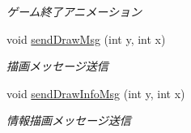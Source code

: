 \begin{DoxyCompactItemize}
\begin{DoxyCompactList}\small\item\em ゲーム終了アニメーション \end{DoxyCompactList}\item 
void \hyperlink{classjp_1_1gr_1_1java__conf_1_1yuta__yoshinaga_1_1reversi_1_1model_1_1_reversi_play_a93ebdb5fb7097984730a85f62ebb57d7}{send\+Draw\+Msg} (int y, int x)
\begin{DoxyCompactList}\small\item\em 描画メッセージ送信 \end{DoxyCompactList}\item 
void \hyperlink{classjp_1_1gr_1_1java__conf_1_1yuta__yoshinaga_1_1reversi_1_1model_1_1_reversi_play_a866c2788aa9dd7eb2084da9fc5e5bd5c}{send\+Draw\+Info\+Msg} (int y, int x)
\begin{DoxyCompactList}\small\item\em 情報描画メッセージ送信 \end{DoxyCompactList}\end{DoxyCompactItemize}
